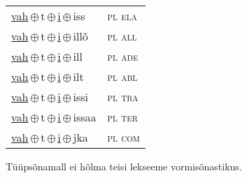 \begin{minipage}{\textwidth}
\begin{sideways}
\begin{tabular}{l l}
\underline{vah}\,$\oplus$\,t\,$\oplus$\,\underline{i}\,$\oplus$\,iss & \textsc{ pl ela } \\
\underline{vah}\,$\oplus$\,t\,$\oplus$\,\underline{i}\,$\oplus$\,illõ & \textsc{ pl all } \\
\underline{vah}\,$\oplus$\,t\,$\oplus$\,\underline{i}\,$\oplus$\,ill & \textsc{ pl ade } \\
\underline{vah}\,$\oplus$\,t\,$\oplus$\,\underline{i}\,$\oplus$\,ilt & \textsc{ pl abl } \\
\underline{vah}\,$\oplus$\,t\,$\oplus$\,\underline{i}\,$\oplus$\,issi & \textsc{ pl tra } \\
\underline{vah}\,$\oplus$\,t\,$\oplus$\,\underline{i}\,$\oplus$\,issaa & \textsc{ pl ter } \\
\underline{vah}\,$\oplus$\,t\,$\oplus$\,\underline{i}\,$\oplus$\,jka & \textsc{ pl com } \\
\end{tabular}
\end{sideways}
\label{tab:tüüpsõnamall-vahti}

\end{minipage}

 
\vspace{1em}
\noindent Tüüpsõnamall  ei hõlma teisi lekseeme vormi\-sõnastikus.
